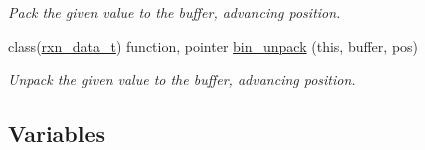 \begin{DoxyCompactItemize}
\begin{DoxyCompactList}\small\item\em Pack the given value to the buffer, advancing position. \end{DoxyCompactList}\item 
class(\mbox{\hyperlink{structpmc__rxn__data_1_1rxn__data__t}{rxn\+\_\+data\+\_\+t}}) function, pointer \mbox{\hyperlink{namespacepmc__rxn__factory_a35c01465a02ea6217cf674e06b17fd2f}{bin\+\_\+unpack}} (this, buffer, pos)
\begin{DoxyCompactList}\small\item\em Unpack the given value to the buffer, advancing position. \end{DoxyCompactList}\end{DoxyCompactItemize}
\subsection*{Variables}

